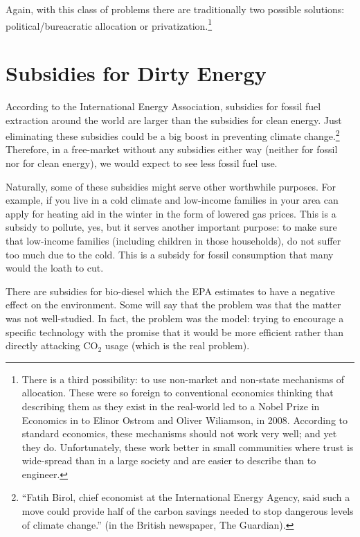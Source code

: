 Again, with this class of problems there are traditionally two possible
solutions: political/bureacratic allocation or privatization.\footnote{There
is a third possibility: to use non-market and non-state mechanisms of
allocation. These were so foreign to conventional economics thinking that
describing them as they exist in the real-world led to a Nobel Prize in
Economics in to Elinor Ostrom and Oliver Wiliamson, in 2008. According to
standard economics, these mechanisms should not work very well; and yet they
do. Unfortunately, these work better in small communities where trust is
wide-spread than in a large society and are easier to describe than to
engineer.}

\section{Subsidies for Dirty Energy}

According to the International Energy Association, subsidies for fossil fuel
extraction around the world are larger than the subsidies for clean energy.
Just eliminating these subsidies could be a big boost in preventing climate
change.\footnote{``Fatih Birol, chief
economist at the International Energy Agency, said such a move could
provide half of the carbon savings needed to stop dangerous levels of climate
change.'' (in the British newspaper, The Guardian).%
} Therefore, in a free-market without any subsidies either way (neither for
fossil nor for clean energy), we would expect to see less fossil fuel use.

Naturally, some of these subsidies might serve other worthwhile purposes. For
example, if you live in a cold climate and low-income families in your area can
apply for heating aid in the winter in the form of lowered gas prices. This is
a subsidy to pollute, yes, but it serves another important purpose: to make
sure that low-income families (including children in those households), do not
suffer too much due to the cold. This is a subsidy for fossil consumption that
many would the loath to cut.


There are subsidies for bio-diesel which the EPA estimates to have a negative
effect on the environment. Some will say that the problem was that the matter was not well-studied.
In fact, the problem was the model: trying to encourage a specific technology
with the promise that it would be more efficient rather than directly attacking
CO${}_2$ usage (which is the real problem).


